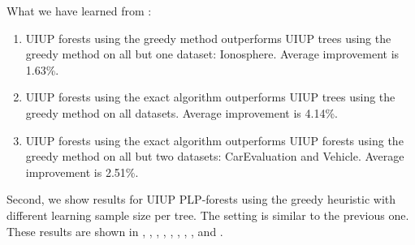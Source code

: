 What we have learned from :
\begin{enumerate}
	\item UIUP forests using the greedy method
				outperforms UIUP trees using the greedy method on all
				but one dataset: Ionosphere.
				Average improvement is 1.63\%.
	\item UIUP forests using the exact algorithm
				outperforms UIUP trees using the greedy method on all
				datasets.
				Average improvement is 4.14\%.
	\item UIUP forests using the exact algorithm
				outperforms UIUP forests using the greedy method on all
				but two datasets: CarEvaluation and Vehicle.
				Average improvement is 2.51\%.
\end{enumerate}


Second, we show results for UIUP PLP-forests using the greedy
heuristic with different learning sample size per tree.
The setting is similar to the previous one.
These results are shown in , , , ,
, , , , and .


